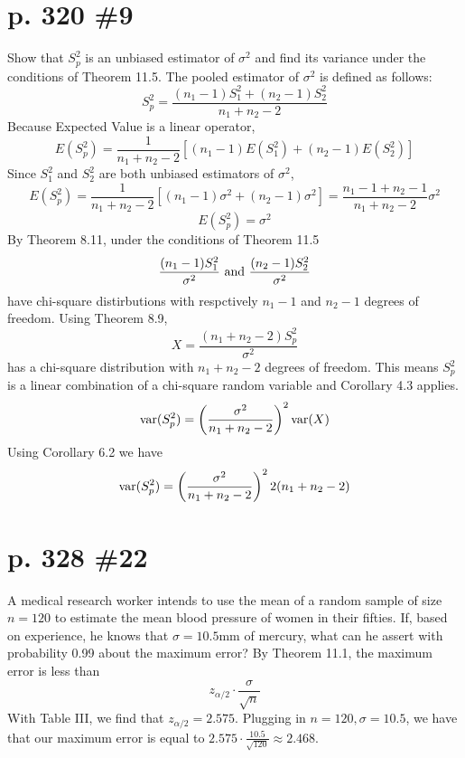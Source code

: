 \documentclass[12pt]{article}
\begin{document}
	\section[20pt]{p. 320 \#9}
	Show that \(S_p^2\) is an unbiased estimator of \(\sigma^2\) and find its variance under the conditions of Theorem 11.5.
	\newline \newline
	The pooled estimator of \(\sigma^2\) is defined as follows:
	\[S_p^2 = \frac{(n_1 -1)S_1^2 + (n_2 - 1)S_2^2}{n_1 + n_2 - 2}\]
	Because Expected Value is a linear operator,
	\[E(S_p^2) = \frac{1}{n_1+n_2-2}[(n_1-1)E(S_1^2) + (n_2-1)E(S_2^2)]\]
	Since \(S_1^2\) and \(S_2^2\) are both unbiased estimators of \(\sigma^2\),
	\[E(S_p^2) = \frac{1}{n_1+n_2-2}[(n_1-1)\sigma^2 + (n_2-1)\sigma^2] = \frac{n_1 -1 + n_2 - 1}{n_1+n_2-2}\sigma^2\]
	\[E(S_p^2) = \sigma^2\]
	\newline \newline
	By Theorem 8.11, under the conditions of Theorem 11.5
	\[\frac{(n_1-1)S_1^2}{\sigma^2} \textup{ and } \frac{(n_2-1)S_2^2}{\sigma^2}\] have chi-square distirbutions with respctively \(n_1 -1\) and \(n_2 -1\) degrees of freedom.
	\newline \newline
	Using Theorem 8.9,
	\[X = \frac{(n_1+n_2-2)S_p^2}{\sigma^2}\]
	has a chi-square distribution with \(n_1+n_2-2\) degrees of freedom.
	\newline \newline
	This means \(S_p^2\) is a linear combination of a chi-square random variable and Corollary 4.3 applies.
	\newline \newline
	\[\textup{var}(S_p^2) = \left(\frac{\sigma^2}{n_1+n_2-2}\right)^2\textup{var}(X)\]
	Using Corollary 6.2 we have
	\[\textup{var}(S_p^2) = \left(\frac{\sigma^2}{n_1+n_2-2}\right)^22(n_1+n_2-2)\]
	\newpage
	\section[20pt]{p. 328 \#22}
	A medical research worker intends to use the mean of a random sample of size \(n=120\) to estimate the mean blood pressure of women in their fifties. If, based on experience, he knows that \(\sigma = 10.5\)mm of mercury, what can he assert with probability 0.99 about the maximum error?
	\newline \newline
	By Theorem 11.1, the maximum error is less than
	\[z_{\alpha/2}\cdot \frac{\sigma}{\sqrt{n}}\]
	With Table III, we find that \(z_{\alpha/2} = 2.575\).
	\newline
	Plugging in \(n=120, \sigma = 10.5\), we have that our maximum error is equal to \(2.575\cdot \frac{10.5}{\sqrt{120}} \approx 2.468\).
	\newline \newline
	\newpage
\end{document}
